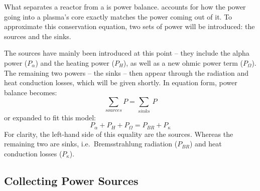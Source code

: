 What separates a reactor from a  is power balance.  accounts for how the power going into a plasma's core exactly matches the power coming out of it. To approximate this conservation equation, two sets of power will be introduced: the sources and the sinks. 

The sources have mainly been introduced at this point -- they include the alpha power ($P_\alpha$)  and the heating power ($P_H$), as well as a new ohmic power term ($P_\Omega$). The remaining two powers -- the sinks -- then appear through the radiation and heat conduction losses, which will be given shortly. In equation form, power balance becomes:
\begin{equation}
	\sum_{sources} P = \sum_{sinks} \, P
\end{equation}
or expanded to fit this model:
\begin{equation}
	\label{eq:power_balance}
	P_\alpha + P_H + P_\Omega = P_{BR} + P_\kappa
\end{equation}
For clarity, the left-hand side of this equality are the sources. Whereas the remaining two are sinks, i.e.\ Bremsstrahlung radiation ($P_{BR}$) and heat conduction losses ($P_\kappa$).

\subsection{Collecting Power Sources}

